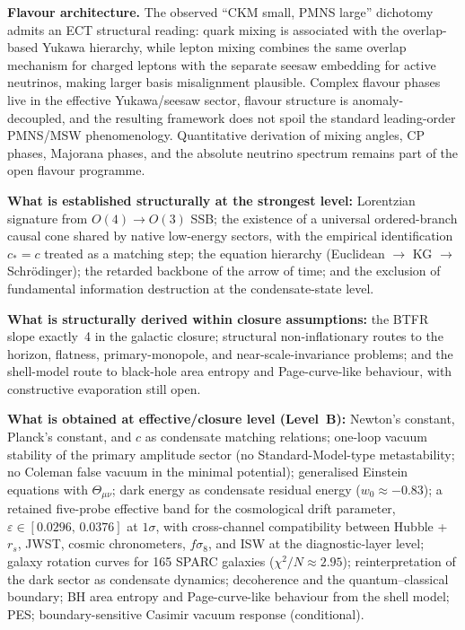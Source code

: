 \documentclass[11pt,a4paper]{article}
\begin{document}
\textbf{Flavour architecture.}
The observed ``CKM small, PMNS large'' dichotomy admits an ECT structural reading: quark mixing is associated with the overlap-based Yukawa hierarchy, while lepton mixing combines the same overlap mechanism for charged leptons with the separate seesaw embedding for active neutrinos, making larger basis misalignment plausible. Complex flavour phases live in the effective Yukawa/seesaw sector, flavour structure is anomaly-decoupled, and the resulting framework does not spoil the standard leading-order PMNS/MSW phenomenology. Quantitative derivation of mixing angles, CP phases, Majorana phases, and the absolute neutrino spectrum remains part of the open flavour programme.

\textbf{What is established structurally at the strongest level:}
Lorentzian signature from $O(4) \to O(3)$ SSB; the existence of a universal ordered-branch causal cone shared by native low-energy sectors, with the empirical identification $c_*=c$ treated as a matching step; the equation hierarchy (Euclidean $\to$ KG $\to$ Schr\"odinger); the retarded backbone of the arrow of time; and the exclusion of fundamental information destruction at the condensate-state level.

\textbf{What is structurally derived within closure assumptions:}
the BTFR slope exactly~4 in the galactic closure; structural non-inflationary routes to the horizon, flatness, primary-monopole, and near-scale-invariance problems; and the shell-model route to black-hole area entropy and Page-curve-like behaviour, with constructive evaporation still open.

\textbf{What is obtained at effective/closure level (Level~B):}
Newton's constant, Planck's constant, and $c$ as condensate matching relations; one-loop vacuum stability of the primary amplitude sector (no Standard-Model-type metastability; no Coleman false vacuum in the minimal potential); generalised Einstein equations with $\Theta_{\mu\nu}$; dark energy as condensate residual energy ($w_0 \approx -0.83$); a retained five-probe effective band for the cosmological drift parameter, $\varepsilon \in [0.0296,\,0.0376]$ at $1\sigma$, with cross-channel compatibility between Hubble + $r_s$, JWST, cosmic chronometers, $f\sigma_8$, and ISW at the diagnostic-layer level; galaxy rotation curves for 165 SPARC galaxies ($\chi^2/N \approx 2.95$); reinterpretation of the dark sector as condensate dynamics; decoherence and the quantum--classical boundary; BH area entropy and Page-curve-like behaviour from the shell model; PES; boundary-sensitive Casimir vacuum response (conditional).
\end{document}

